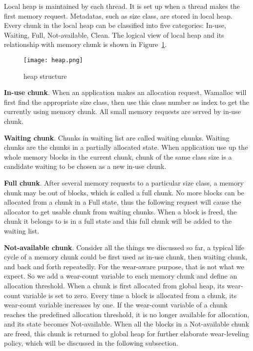 \documentclass[10pt, conference, compsocconf]{IEEEtran}
\begin{document}
Local heap is maintained by each thread. 
It is set up when a thread makes the first memory request.
Metadatas, such as size class, are stored in local heap. 
Every chunk in the local heap can be classified into five categories: In-use, Waiting, Full, Not-available, Clean.
The logical view of local heap and its relationship with memory chunk is shown in Figure~\ref{fig:heap}.

\begin{figure}[h]
\centering
\texttt{[image: heap.png]}
\caption{heap structure}
\label{fig:heap}
\end{figure}

\textbf{In-use chunk}. 
When an application makes an allocation request, 
Wamalloc will first find the appropriate size class, then use this class number as index to get the currently using memory chunk. 
All small memory requests are served by in-use chunk.

\textbf{Waiting chunk}. 
Chunks in waiting list are called waiting chunks. 
Waiting chunks are the chunks in a partially allocated state. 
When application use up the whole memory blocks in the current chunk, chunk of the same class size is a candidate waiting to be chosen as a new in-use chunk.

\textbf{Full chunk}. 
After several memory requests to a particular size class, a memory chunk may be out of blocks, which is called a full chunk.
No more blocks can be allocated from a chunk in a Full state, 
thus the following request will cause the allocator to get usable chunk from waiting chunks.
When a block is freed, the chunk it belongs to is in a full state and this full chunk will be added to the waiting list.

\textbf{Not-available chunk}.
Consider all the things we discussed so far, a typical life cycle of a memory chunk could be first used as in-use chunk, then waiting chunk, and back and forth repeatedly. 
For the wear-aware purpose, that is not what we expect. 
So we add a wear-count variable to each memory chunk and define an allocation threshold. 
When a chunk is first allocated from global heap, its wear-count variable is set to zero.
Every time a block is allocated from a chunk, its wear-count variable increases by one. 
If the wear-count variable of a chunk reaches the predefined allocation threshold, it is no longer available for allocation, and its state becomes Not-available. 
When all the blocks in a Not-available chunk are freed, this chunk is returned to global heap for further elaborate wear-leveling policy, which will be discussed in the following subsection.
\end{document}
